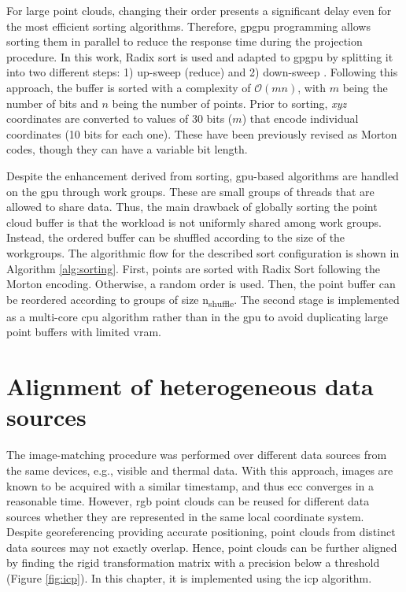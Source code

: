 For large point clouds, changing their order presents a significant delay even for the most efficient sorting algorithms. Therefore, \acrshort{gpgpu} programming allows sorting them in parallel to reduce the response time during the projection procedure. In this work, Radix sort is used and adapted to \acrshort{gpgpu} by splitting it into two different steps: 1) up-sweep (reduce) and 2) down-sweep \cite{nguyen_gpu_2007}. Following this approach, the buffer is sorted with a complexity of $\mathcal{O}(mn)$, with $m$ being the number of bits and $n$ being the number of points. Prior to sorting, \textit{xyz} coordinates are converted to values of 30 bits ($m$) that encode individual coordinates (10 bits for each one). These have been previously revised as Morton codes, though they can have a variable bit length.

Despite the enhancement derived from sorting, \acrshort{gpu}-based algorithms are handled on the \acrshort{gpu} through work groups. These are small groups of threads that are allowed to share data. Thus, the main drawback of globally sorting the point cloud buffer is that the workload is not uniformly shared among work groups. Instead, the ordered buffer can be shuffled according to the size of the workgroups. The algorithmic flow for the described sort configuration is shown in Algorithm \ref{alg:sorting}. First, points are sorted with Radix Sort following the Morton encoding. Otherwise, a random order is used. Then, the point buffer can be reordered according to groups of size n\textsubscript{shuffle}. The second stage is implemented as a multi-core \acrshort{cpu} algorithm rather than in the \acrshort{gpu} to avoid duplicating large point buffers with limited \acrshort{vram}.

\section{Alignment of heterogeneous data sources}

The image-matching procedure was performed over different data sources from the same devices, e.g., visible and thermal data. With this approach, images are known to be acquired with a similar timestamp, and thus \acrshort{ecc} converges in a reasonable time. However, \acrshort{rgb} point clouds can be reused for different data sources whether they are represented in the same local coordinate system. Despite georeferencing providing accurate positioning, point clouds from distinct data sources may not exactly overlap. Hence, point clouds can be further aligned by finding the rigid transformation matrix with a precision below a threshold (Figure \ref{fig:icp}). In this chapter, it is implemented using the \acrshort{icp} algorithm.

